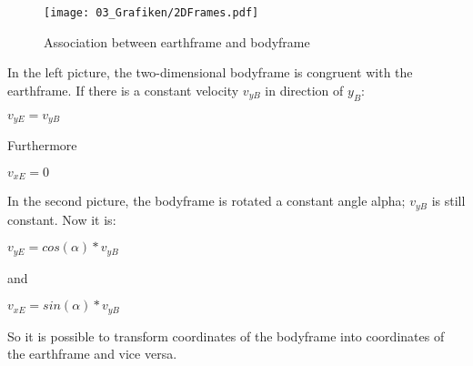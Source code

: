 \begin{figure}[htbp]
	\centering
		\texttt{[image: 03\_Grafiken/2DFrames.pdf]}
	\caption{Association between earthframe and bodyframe}
	\label{fig:2DFrames}
\end{figure}

In the left picture, the two-dimensional bodyframe is congruent with the earthframe. If there is a constant velocity $v_{yB}$ in direction of $y_B$:
\begin{center}
	$v_{yE} = v_{yB}$
\end{center}
Furthermore 
\begin{center}
	$v_{xE} = 0$ 
\end{center}
In the second picture, the bodyframe is rotated a constant angle alpha; $v_{yB}$ is still constant. Now it is: 
\begin{center}
$v_{yE} = cos(\alpha)*v_{yB}$
\end{center}
and 
\begin{center}
$v_{xE} = sin(\alpha)*v_{yB}$
\end{center}
So it is possible to transform coordinates of the bodyframe into coordinates of the earthframe and vice versa.